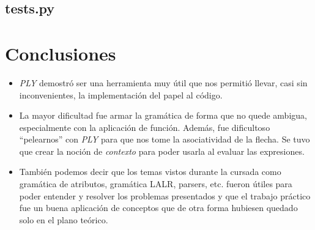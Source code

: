 \documentclass[spanish, a4paper]{article}
\begin{document}
\subsection{tests.py}
      

\newpage
\section{Conclusiones}
\begin{itemize}
\item \textit{PLY} demostró ser una herramienta muy útil que nos permitió llevar, casi sin inconvenientes, la implementación del papel al código.

\item La mayor dificultad fue armar la gramática de forma que no quede ambigua, especialmente con la aplicación de función. Además, fue dificultoso ``pelearnos'' con \textit{PLY} para que nos tome la asociatividad de la flecha. Se tuvo que crear la noción de \textit{contexto} para poder usarla al evaluar las expresiones.

\item También podemos decir que los temas vistos durante la cursada como gramática de atributos, gramática LALR, parsers, etc. fueron útiles para poder entender y resolver los problemas presentados y que el trabajo práctico fue un buena aplicación de conceptos que de otra forma hubiesen quedado solo en el plano teórico.
\end{itemize}

%

\end{document}
